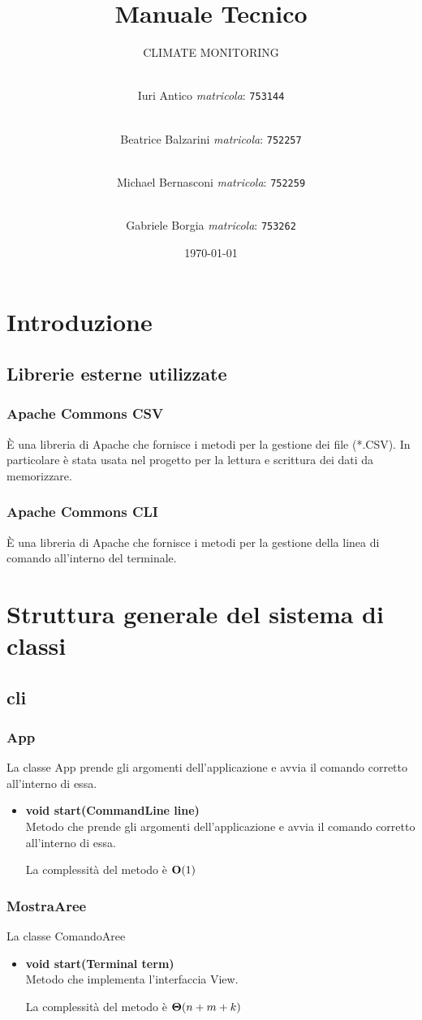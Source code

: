 \documentclass[a4paper, 12pt]{scrreprt}
\title {Manuale Tecnico}
\subtitle{CLIMATE MONITORING}
\author{
	\\Iuri Antico \textit{matricola}:
	\texttt{753144}
	\and \\
	Beatrice Balzarini \textit{matricola}:
	\texttt{752257}
	\and \\
	Michael Bernasconi \textit{matricola}:
	\texttt{752259}
	\and \\
	Gabriele Borgia \textit{matricola}:
	\texttt{753262}
}
\date{\today}
\begin{document}
	\maketitle

	\tableofcontents
	\listoffigures
	\listoftables

	\chapter{Introduzione}
		\section{Librerie esterne utilizzate}
			\subsection{Apache Commons CSV}
			\`E una libreria di Apache che fornisce i metodi per la gestione dei file (*.CSV). In particolare \`e stata usata nel progetto per la lettura e scrittura dei dati da memorizzare.
			\subsection{Apache Commons CLI}
			\`E una libreria di Apache che fornisce i metodi per la gestione della linea di comando all'interno del terminale.

	\chapter{Struttura generale del sistema di classi}
		\section{cli}
			\subsection{App}
			La classe App prende gli argomenti dell'applicazione e avvia il comando corretto all'interno di essa.
			\begin{itemize}
				\item \textbf{void start(CommandLine line)}
				\\Metodo che prende gli argomenti dell'applicazione e avvia il comando corretto all'interno di essa.
				
				La complessit\`a del metodo è $\mathbf{O}(1)$
			\end{itemize}
			
			\subsection{MostraAree}
			La classe ComandoAree
			\begin{itemize}
				\item \textbf{void start(Terminal term)}
				\\Metodo che implementa l'interfaccia View.
				
				La complessit\`a del metodo è $\mathbf{\Theta}(n+m+k)$
				
			\end{itemize}
\end{document}
